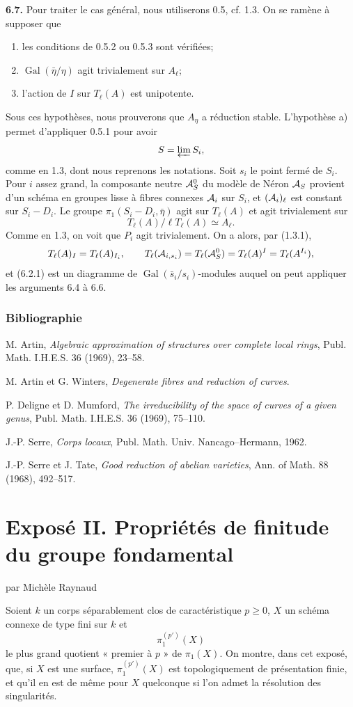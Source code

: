 \documentclass[11pt]{article}
\providecommand{\Gal}{\operatorname{Gal}}
\providecommand{\limproj}{\varprojlim}
\begin{document}
\textbf{6.7.} Pour traiter le cas général, nous utiliserons 0.5, cf. 1.3. On se ramène à supposer que
\begin{enumerate}[label=\alph*)]
\item les conditions de 0.5.2 ou 0.5.3 sont vérifiées;
\item $\Gal(\bar\eta/\eta)$ agit trivialement sur $A_\ell$;
\item l'action de $I$ sur $T_\ell(A)$ est unipotente.
\end{enumerate}
Sous ces hypothèses, nous prouverons que $A_\eta$ a réduction stable. L'hypothèse a) permet d'appliquer 0.5.1 pour avoir
\[
 S=\limproj S_i,
\]
comme en 1.3, dont nous reprenons les notations. Soit $s_i$ le point fermé de $S_i$. Pour $i$ assez grand, la composante neutre $\mathcal A^0_S$ du modèle de Néron $\mathcal A_S$ provient d'un schéma en groupes lisse à fibres connexes $\mathcal A_i$ sur $S_i$, et $(\mathcal A_i)_\ell$ est constant sur $S_i-D_i$. Le groupe $\pi_1(S_i-D_i,\bar\eta)$ agit sur $T_\ell(A)$ et agit trivialement sur
\[
 T_\ell(A)/\ell T_\ell(A)\simeq A_\ell.
\]
Comme en 1.3, on voit que $P_i$ agit trivialement. On a alors, par (1.3.1),
\[
 T_\ell(A)_I=T_\ell(A)_{I_i},
 \qquad
 T_\ell(\mathcal A_{i,s_i})=T_\ell(\mathcal A^0_S)=T_\ell(A)^I=T_\ell(A^{I_i}),
\]
et (6.2.1) est un diagramme de $\Gal(\bar s_i/s_i)$-modules auquel on peut appliquer les arguments 6.4 à 6.6.

\subsubsection*{Bibliographie}
\begin{enumerate}[label={[\arabic*]}]
\item M. Artin, \emph{Algebraic approximation of structures over complete local rings}, Publ. Math. I.H.E.S. 36 (1969), 23--58.
\item M. Artin et G. Winters, \emph{Degenerate fibres and reduction of curves}.
\item P. Deligne et D. Mumford, \emph{The irreducibility of the space of curves of a given genus}, Publ. Math. I.H.E.S. 36 (1969), 75--110.
\item J.-P. Serre, \emph{Corps locaux}, Publ. Math. Univ. Nancago--Hermann, 1962.
\item J.-P. Serre et J. Tate, \emph{Good reduction of abelian varieties}, Ann. of Math. 88 (1968), 492--517.
\end{enumerate}

\section*{Exposé II. Propriétés de finitude du groupe fondamental}
\begin{center}
par Michèle Raynaud
\end{center}
Soient $k$ un corps séparablement clos de caractéristique $p\ge0$, $X$ un schéma connexe de type fini sur $k$ et
\[
 \pi_1^{(p')}(X)
\]
le plus grand quotient « premier à $p$ » de $\pi_1(X)$. On montre, dans cet exposé, que, si $X$ est une surface, $\pi_1^{(p')}(X)$ est topologiquement de présentation finie, et qu'il en est de même pour $X$ quelconque si l'on admet la résolution des singularités.
\end{document}
